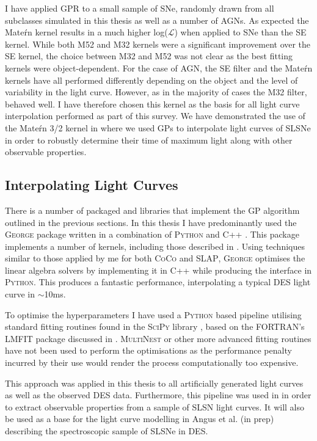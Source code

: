 I have applied GPR to a small sample of SNe, randomly drawn from all subclasses simulated in this thesis as well as a number of AGNs. As expected the Mate\'rn kernel results in a much higher log($\mathcal{L}$) when applied to SNe than the SE kernel. While both M52 and M32 kernels were a significant improvement over the SE kernel, the choice between M32 and M52 was not clear as the best fitting kernels were object-dependent. For the case of AGN, the SE filter and the Mate\'rn kernels have all performed differently depending on the object and the level of variability in the light curve. However, as in the majority of cases the M32 filter, behaved well. I have therefore chosen this kernel as the basis for all light curve interpolation performed as part of this survey. We have demonstrated the use of the Mate\'rn 3/2 kernel in \citet{Inserra2018} where we used GPs to interpolate light curves of SLSNe in order to robustly determine their time of maximum light along with other observable properties.

\subsection{Interpolating Light Curves}
There is a number of packaged and libraries that implement the GP algorithm outlined in the previous sections. In this thesis I have predominantly used the \textsc{George} package written in a combination of \textsc{Python} and \textsc{C++} \citep{Ambikasaran2014}. This package implements a number of kernels, including those described in . Using techniques similar to those applied by me for both \textsc{CoCo} and \textsc{SLAP}, \textsc{George} optimises the linear algebra solvers by implementing it in \textsc{C++} while producing the interface in \textsc{Python}. This produces a fantastic performance, interpolating a typical DES light curve in $\sim$10ms.

To optimise the hyperparameters I have used a \textsc{Python} based pipeline utilising standard fitting routines found in the \textsc{SciPy} library \citep{Oliphant2007}, based on the \textsc{FORTRAN}'s \textsc{LMFIT} package discussed in . \textsc{MultiNest} or other more advanced fitting routines have not been used to perform the optimisations as the performance penalty incurred by their use would render the process computationally too expensive.

This approach was applied in this thesis to all artificially generated light curves as well as the observed DES data. Furthermore, this pipeline was used in \citet{Inserra2018} in order to extract observable properties from a sample of SLSN light curves. It will also be used as a base for the light curve modelling in Angus et al. (in prep) describing the spectroscopic sample of SLSNe in DES.

